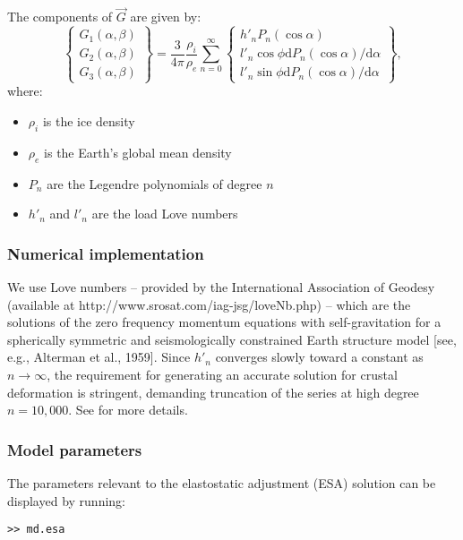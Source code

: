 The components of $\vec{G}$ are given by:
\begin{equation}
	\left\{
	\begin{array}{l}
		G_1(\alpha,\beta) \\
		G_2(\alpha,\beta) \\
		G_3(\alpha,\beta)
	\end{array}
	\right\}
	=
	\frac{3}{4\pi} \frac{\rho_i}{\rho_e} \sum_{n=0}^\infty
	\left\{
	\begin{array}{l}
		h'_n P_n(\cos \alpha) \\
		l'_n \cos\phi \text{d}P_n(\cos \alpha) / \text{d} \alpha \\
		l'_n \sin\phi \text{d}P_n(\cos \alpha) / \text{d} \alpha
	\end{array}
	\right\},
\end{equation}
where:
\begin{itemize}
	\item $\rho_i$ is the ice density
	\item $\rho_e$ is the Earth's global mean density
	\item $P_n$ are the Legendre polynomials of degree $n$
	\item $h'_n$ and $l'_n$ are the load Love numbers
\end{itemize}

\subsubsection{Numerical implementation}
We use Love numbers -- provided by the International Association of Geodesy (available at http://www.srosat.com/iag-jsg/loveNb.php) -- which are the solutions of the zero frequency momentum equations with self-gravitation for a spherically symmetric and seismologically constrained Earth structure model [see, e.g., Alterman et al., 1959]. Since $h'_n$ converges slowly toward a constant as $n \rightarrow \infty$, the requirement for generating an accurate solution for crustal deformation is stringent, demanding truncation of the series at high degree $n = 10,000$. See \citep{Adhikari2017} for more details.

\subsubsection{Model parameters}
The parameters relevant to the elastostatic adjustment (ESA) solution can be displayed by running:
\begin{lstlisting}
>> md.esa
\end{lstlisting}

